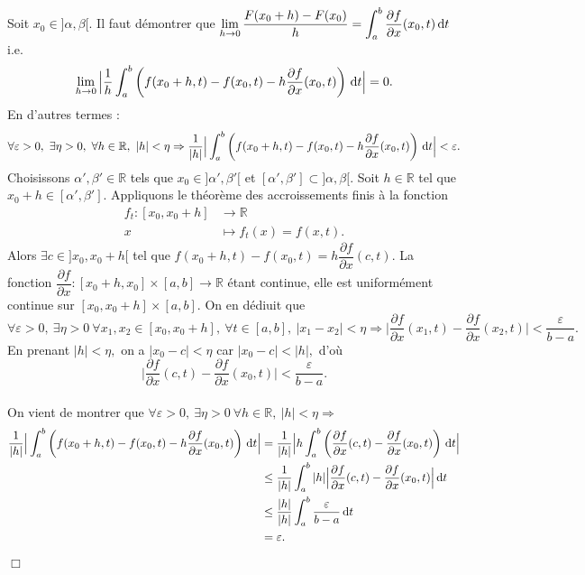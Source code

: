 \documentclass[11pt, a4paper]{book}
\newenvironment{pr}{\noindent {\bf Preuve} \noindent} {\hfill $\Box$\vskip 5mm}
\begin{document}
\begin{pr}\quad
Soit $x_0\in ]\alpha,\beta[.$ Il faut d\'emontrer que ${\displaystyle \lim_{h\rightarrow0}\dfrac{F(x_0+h)-F(x_0)}{h}=\int_a^b\dfrac{\partial f}{\partial x}(x_0,t)\,\mathrm{d} t}$ i.e. 
$$\lim_{h\rightarrow0}\Big|\dfrac{1}{h}\int_a^b\left(f(x_0+h,t)-f(x_0,t)-h\dfrac{\partial f}{\partial x}(x_0,t)\right)\,\mathrm{d} t\Big|=0.$$ En d'autres termes : 
$$\forall \varepsilon>0,~\exists\eta>0,~\forall h\in \mathbb{R},~|h|<\eta\Rightarrow {\displaystyle \dfrac{1}{|h|}\Big|\int_a^b\left(f(x_0+h,t)-f(x_0,t)-h\dfrac{\partial f}{\partial x}(x_0,t)\right)\,\mathrm{d}t\Big|<\varepsilon.}$$ Choisissons $\alpha',\beta'\in \mathbb{R}$ tels que $x_0\in ]\alpha',\beta'[$ et $[\alpha',\beta']\subset]\alpha,\beta[.$ Soit $h\in \mathbb{R}$ tel que $x_0+h\in [\alpha',\beta'].$ Appliquons le th\'eor\`eme des accroissements finis \`a la fonction \begin{align*}
f_t:[x_0,x_0+h]&\rightarrow\mathbb{R}\\x&\mapsto f_t(x)=f(x,t).
\end{align*} Alors $\exists c\in]x_0,x_0+h[$ tel que $f(x_0+h,t)-f(x_0,t)=h\dfrac{\partial f}{\partial x}(c,t).$ La fonction $\dfrac{\partial f}{\partial x}:[x_0+h,x_0]\times[a,b]\rightarrow\mathbb{R}$ \'etant continue, elle est uniform\'ement continue  sur $[x_0,x_0+h]\times[a,b].$ On en d\'ediuit que $$\forall \varepsilon>0,~\exists\eta>0~\forall x_1,x_2\in [x_0,x_0+h],~\forall t\in [a,b],~|x_1-x_2|<\eta\Rightarrow\Big|\dfrac{\partial f}{\partial x}(x_1,t)-\dfrac{\partial f}{\partial x}(x_2,t)\Big|<\dfrac{\varepsilon}{b-a}.$$ En prenant $|h|<\eta,$ on a $|x_0-c|<\eta$ car $|x_0-c|<|h|,$ d'o\`u $$\Big|\dfrac{\partial f}{\partial x}(c,t)-\dfrac{\partial f}{\partial x}(x_0,t)\Big|<\dfrac{\varepsilon}{b-a}.$$ \\
On vient de montrer que $\forall \varepsilon>0,~\exists \eta>0~\forall h\in \mathbb{R},~|h|<\eta\Rightarrow$ \begin{align*}
\dfrac{1}{|h|}\Big|\int_a^b\left(f(x_0+h,t)-f(x_0,t)-h\dfrac{\partial f}{\partial x}(x_0,t)\right)\,\mathrm{d} t\Big| &=\dfrac{1}{|h|}\Big|h\int_a^b\left(\dfrac{\partial f}{\partial x}(c,t)-\dfrac{\partial f}{\partial x}(x_0,t)\right)\,\mathrm{d} t\Big|\\ 
&\leq \dfrac{1}{|h|}\int_a^b|h|\Big|\dfrac{\partial f}{\partial x}(c,t)- \dfrac{\partial f}{\partial x}(x_0,t)\Big|\,\mathrm{d} t \\
&\leq \dfrac{|h|}{|h|}\int_a^b\dfrac{\varepsilon}{b-a}\,\mathrm{d} t\\&=\varepsilon.
\end{align*}
\end{pr}
\end{document}
